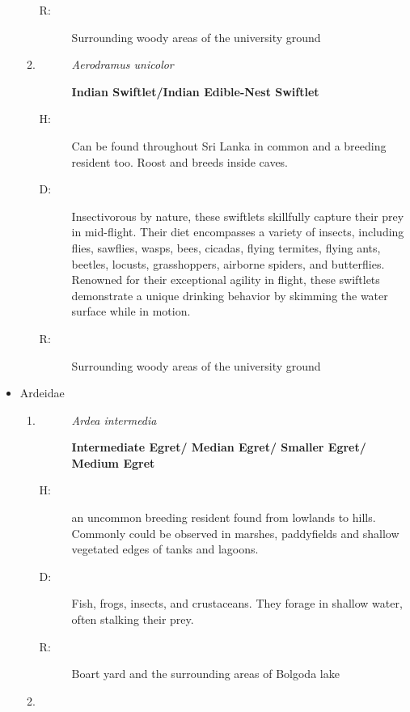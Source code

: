 \begin{itemize}
\begin{enumerate}
\begin{description}
\item[R: ]%
Surrounding woody areas of the university ground%
\end{description}%
\item%
\begin{description}%
\item[]%
\textit{Aerodramus unicolor}%
\item[]%
\textbf{Indian Swiftlet/Indian Edible{-}Nest Swiftlet}%
\end{description}%
\begin{description}%
\item[H: ]%
Can be found throughout Sri Lanka in common and a breeding resident too. Roost and breeds inside caves.%
\item[D: ]%
Insectivorous by nature, these swiftlets skillfully capture their prey in mid{-}flight. Their diet encompasses a variety of insects, including flies, sawflies, wasps, bees, cicadas, flying termites, flying ants, beetles, locusts, grasshoppers, airborne spiders, and butterflies. Renowned for their exceptional agility in flight, these swiftlets demonstrate a unique drinking behavior by skimming the water surface while in motion.%
\item[R: ]%
Surrounding woody areas of the university ground%
\end{description}%
\end{enumerate}%
\item%
Ardeidae%
\begin{enumerate}%
\item%
\begin{description}%
\item[]%
\textit{Ardea intermedia}%
\item[]%
\textbf{Intermediate Egret/ Median Egret/ Smaller Egret/ Medium Egret}%
\end{description}%
\begin{description}%
\item[H: ]%
an uncommon breeding resident found from lowlands to hills. Commonly could be observed in marshes, paddyfields and shallow vegetated edges of tanks and lagoons.%
\item[D: ]%
Fish, frogs, insects, and crustaceans. They forage in shallow water, often stalking their prey.%
\item[R: ]%
Boart yard and the surrounding areas of Bolgoda lake%
\end{description}%
\item%
\begin{description}%

\end{description}
\end{enumerate}
\end{itemize}
